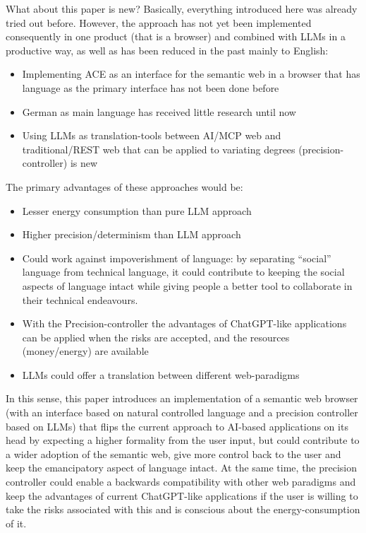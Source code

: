\documentclass[12pt,a4paper]{article}
\begin{document}
What about this paper is new? Basically, everything introduced here was already tried out before. However, the approach has not yet been implemented consequently in one product (that is a browser) and combined with LLMs in a productive way, as well as has been reduced in the past mainly to English:
\begin{itemize}
    \item Implementing ACE as an interface for the semantic web in a browser that has language as the primary interface has not been done before
    \item German as main language has received little research until now
    \item Using LLMs as translation-tools between AI/MCP web and traditional/REST web that can be applied to variating degrees (precision-controller) is new
\end{itemize}

The primary advantages of these approaches would be:
\begin{itemize}
    \item Lesser energy consumption than pure LLM approach
    \item Higher precision/determinism than LLM approach
    \item Could work against impoverishment of language: by separating ``social'' language from technical language, it could contribute to keeping the social aspects of language intact while giving people a better tool to collaborate in their technical endeavours.
    \item With the Precision-controller the advantages of ChatGPT-like applications can be applied when the risks are accepted, and the resources (money/energy) are available
    \item LLMs could offer a translation between different web-paradigms
\end{itemize}

In this sense, this paper introduces an implementation of a semantic web browser (with an interface based on natural controlled language and a precision controller based on LLMs) that flips the current approach to AI-based applications on its head by expecting a higher formality from the user input, but could contribute to a wider adoption of the semantic web, give more control back to the user and keep the emancipatory aspect of language intact. At the same time, the precision controller could enable a backwards compatibility with other web paradigms and keep the advantages of current ChatGPT-like applications if the user is willing to take the risks associated with this and is conscious about the energy-consumption of it.
\end{document}
